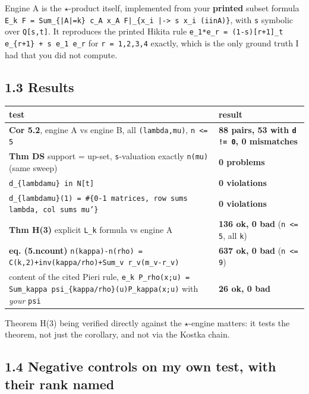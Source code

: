 \documentclass[11pt,a4paper]{article}
\begin{document}
Engine A is the $\star$-product itself, implemented from your \textbf{printed} subset formula \mbox{\texttt{E\_k F = Sum\_\{|A|=k\} c\_A x\_A F|\_\{x\_i |-> s x\_i (iinA)\}}}, with \mbox{\texttt{s}} symbolic over \mbox{\texttt{Q[s,t]}}. It reproduces the printed Hikita rule \mbox{\texttt{e\_1*e\_r = (1-s)[r+1]\_t e\_\{r+1\} + s e\_1 e\_r}} for \mbox{\texttt{r = 1,2,3,4}} exactly, which is the only ground truth I had that you did not compute.

\subsection*{1.3 Results}

\begin{center}\footnotesize
\begin{tabular}{@{}p{}p{}@{}}
\hline
\textbf{test} & \textbf{result}\\ \hline
\textbf{Cor 5.2}, engine A vs engine B, all \mbox{\texttt{(lambda,mu)}}, \mbox{\texttt{n <= 5}} & \textbf{88 pairs, 53 with \mbox{\texttt{d != 0}}, 0 mismatches}\\
\textbf{Thm DS} support = up-set, \mbox{\texttt{s}}-valuation exactly \mbox{\texttt{n(mu)}} (same sweep) & \textbf{0 problems}\\
\mbox{\texttt{d\_\{lambdamu\} in N[t]}} & \textbf{0 violations}\\
\mbox{\texttt{d\_\{lambdamu\}(1) = \#\{0-1 matrices, row sums lambda, col sums mu'\}}} & \textbf{0 violations}\\
\textbf{Thm H(3)} explicit \mbox{\texttt{L\_k}} formula vs engine A & \textbf{136 ok, 0 bad} (\mbox{\texttt{n <= 5}}, all \mbox{\texttt{k}})\\
\textbf{eq. (5.ncount)} \mbox{\texttt{n(kappa)-n(rho) = C(k,2)+inv(kappa/rho)+Sum\_v r\_v(m\_v-r\_v)}} & \textbf{637 ok, 0 bad} (\mbox{\texttt{n <= 9}})\\
content of the cited Pieri rule, \mbox{\texttt{e\_k P\_rho(x;u) = Sum\_kappa psi\_\{kappa/rho\}(u)P\_kappa(x;u)}} with \emph{your} \mbox{\texttt{psi}} & \textbf{26 ok, 0 bad}\\
\hline\end{tabular}\end{center}

Theorem H(3) being verified directly against the $\star$-engine matters: it tests the theorem, not just the corollary, and not via the Kostka chain.

\subsection*{1.4 Negative controls on my own test, with their rank named}
\end{document}
